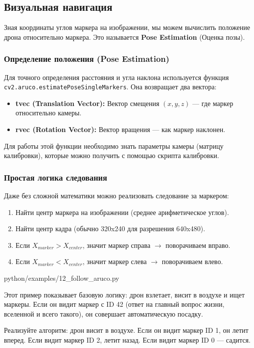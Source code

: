 \subsection{Визуальная навигация}

Зная координаты углов маркера на изображении, мы можем вычислить положение дрона относительно маркера. Это называется \textbf{Pose Estimation} (Оценка позы).

\subsubsection*{Определение положения (Pose Estimation)}
Для точного определения расстояния и угла наклона используется функция \texttt{cv2.aruco.estimatePoseSingleMarkers}.
Она возвращает два вектора:
\begin{itemize}
    \item \textbf{tvec (Translation Vector):} Вектор смещения $(x, y, z)$ — где маркер относительно камеры.
    \item \textbf{rvec (Rotation Vector):} Вектор вращения — как маркер наклонен.
\end{itemize}

Для работы этой функции необходимо знать параметры камеры (матрицу калибровки), которые можно получить с помощью скрипта калибровки.

\subsubsection*{Простая логика следования}
Даже без сложной математики можно реализовать следование за маркером:
\begin{enumerate}
    \item Найти центр маркера на изображении (среднее арифметическое углов).
    \item Найти центр кадра (обычно 320x240 для разрешения 640x480).
    \item Если $X_{marker} > X_{center}$, значит маркер справа $\rightarrow$ поворачиваем вправо.
    \item Если $X_{marker} < X_{center}$, значит маркер слева $\rightarrow$ поворачиваем влево.
\end{enumerate}

\begin{codefile}[python]{python/examples/12_follow_aruco.py}
\end{codefile}

Этот пример показывает базовую логику: дрон взлетает, висит в воздухе и ищет маркеры. Если он видит маркер с ID 42 (ответ на главный вопрос жизни, вселенной и всего такого), он совершает автоматическую посадку.

\begin{taskbox}
Реализуйте алгоритм: дрон висит в воздухе. Если он видит маркер ID 1, он летит вперед. Если видит маркер ID 2, летит назад. Если видит маркер ID 0 — садится.
\end{taskbox}
